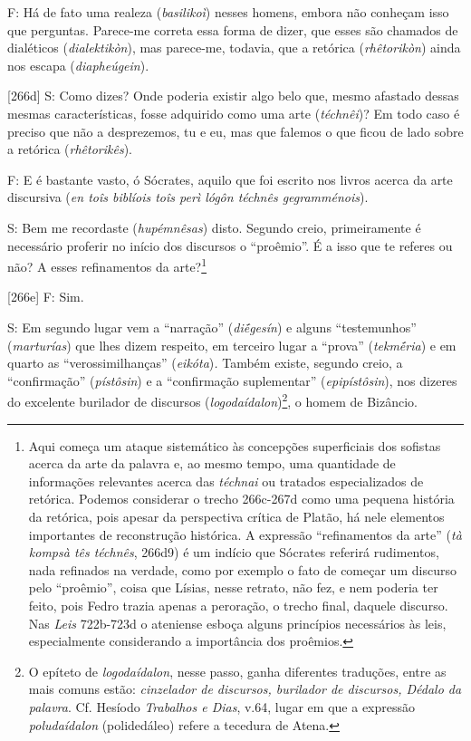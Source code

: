 F: Há de fato uma realeza (\emph{basilikoì}) nesses homens, embora não
conheçam isso que perguntas. Parece-me correta essa forma de dizer, que
esses são chamados de dialéticos (\emph{dialektikòn}), mas parece-me,
todavia, que a retórica (\emph{rhêtorikòn}) ainda nos escapa
(\emph{diapheúgein}).

{[}266d{]} S: Como dizes? Onde poderia existir algo belo que, mesmo
afastado dessas mesmas características, fosse adquirido como uma arte
(\emph{téchnêi})? Em todo caso é preciso que não a desprezemos, tu e eu,
mas que falemos o que ficou de lado sobre a retórica
(\emph{rhêtorikês}).

F: E é bastante vasto, ó Sócrates, aquilo que foi escrito nos livros
acerca da arte discursiva (\emph{en toîs biblíois toîs perì lógôn
téchnês gegramménois}).

S: Bem me recordaste (\emph{hupémnêsas}) disto. Segundo creio,
primeiramente é necessário proferir no início dos discursos o
``proêmio''. É a isso que te referes ou não? A esses refinamentos da
arte?\footnote{Aqui começa um ataque sistemático às concepções
  superficiais dos sofistas acerca da arte da palavra e, ao mesmo tempo,
  uma quantidade de informações relevantes acerca das \emph{téchnai} ou
  tratados especializados de retórica. Podemos considerar o trecho
  266c-267d como uma pequena história da retórica, pois apesar da
  perspectiva crítica de Platão, há nele elementos importantes de
  reconstrução histórica. A expressão ``refinamentos da arte'' (\emph{tà
  kompsà tês téchnês}, 266d9) é um indício que Sócrates referirá
  rudimentos, nada refinados na verdade, como por exemplo o fato de
  começar um discurso pelo ``proêmio'', coisa que Lísias, nesse retrato,
  não fez, e nem poderia ter feito, pois Fedro trazia apenas a
  peroração, o trecho final, daquele discurso. Nas \emph{Leis} 722b-723d
  o ateniense esboça alguns princípios necessários às leis,
  especialmente considerando a importância dos proêmios.}

{[}266e{]} F: Sim.

S: Em segundo lugar vem a ``narração'' (\emph{diḗgesín}) e alguns
``testemunhos'' (\emph{marturías}) que lhes dizem respeito, em terceiro
lugar a ``prova'' (\emph{tekmḗria}) e em quarto as ``verossimilhanças''
(\emph{eikóta})\emph{.} Também existe, segundo creio, a ``confirmação''
(\emph{pístôsin}) e a ``confirmação suplementar'' (\emph{epipístôsin}),
nos dizeres do excelente burilador de discursos
(\emph{logodaídalon})\footnote{O epíteto de \emph{logodaídalon}, nesse
  passo, ganha diferentes traduções, entre as mais comuns estão:
  \emph{cinzelador de discursos, burilador de discursos, Dédalo da
  palavra}. Cf. Hesíodo \emph{Trabalhos e Dias}, v.64, lugar em que a
  expressão \emph{poludaídalon} (polidedáleo) refere a tecedura de
  Atena.}, o homem de Bizâncio.

